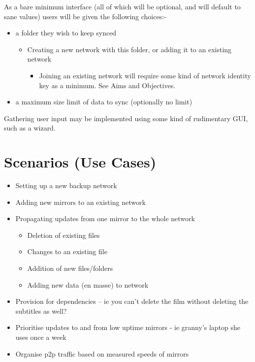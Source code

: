 \documentclass[12pt,a4paper,]{book}
\begin{document}
As a bare minimum interface (all of which will be optional, and will
default to sane values) users will be given the following choices:-

\begin{itemize}
\itemsep1pt\parskip0pt
\item
  a folder they wish to keep synced

  \begin{itemize}
  \itemsep1pt\parskip0pt
  \item
    Creating a new network with this folder, or adding it to an existing
    network

    \begin{itemize}
    \itemsep1pt\parskip0pt
    \item
      Joining an existing network will require some kind of network
      identity key as a minimum. See Aims and Objectives.
    \end{itemize}
  \end{itemize}
\item
  a maximum size limit of data to sync (optionally no limit)
\end{itemize}

Gathering user input may be implemented using some kind of rudimentary
GUI, such as a wizard.

\section{Scenarios (Use Cases)}\label{scenarios-use-cases}

\begin{itemize}
\itemsep1pt\parskip0pt
\item
  Setting up a new backup network
\item
  Adding new mirrors to an existing network
\item
  Propagating updates from one mirror to the whole network

  \begin{itemize}
  \itemsep1pt\parskip0pt
  \item
    Deletion of existing files
  \item
    Changes to an existing file
  \item
    Addition of new files/folders
  \item
    Adding new data (en masse) to network
  \end{itemize}
\item
  Provision for dependencies -- ie you can't delete the film without
  deleting the subtitles as well?
\item
  Prioritise updates to and from low uptime mirrors - ie granny's laptop
  she uses once a week
\item
  Organise p2p traffic based on measured speeds of mirrors
\end{itemize}
\end{document}
